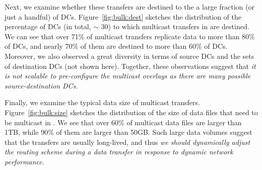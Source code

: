 Next, we examine whether these transfers are destined to the
a large fraction (or just a handful) of DCs.
Figure~\ref{fig:bulk:dest} sketches the distribution of the
percentage of DCs (in total, $\sim$ 30) to which multicast
transfers in \company are destined.
We can see that over 71\% of multicast transfers replicate data
to more than 80\% of DCs, and nearly 70\% of them are destined
to more than 60\% of DCs.
Moreover, we also observed a great diversity  in terms of
source DCs and the sets of destination DCs (not shown here).
Together, these observations suggest that {\em it is not
scalable to pre-configure the multicast overlays as there
are many possible source-destination DCs.}


Finally, we examine the typical data size of multicast transfers.
Figure~\ref{fig:bulk:size} sketches the distribution of the
size of data files that need to be multicast in \company.
We see that over 60\% of multicast data files are larger than 1TB,
while 90\% of them are larger than 50GB.
Such large data volumes suggest that the transfers are usually
long-lived, and thus {\em we should dynamically adjust
the routing scheme during a data transfer in response to
dynamic network performance.}


